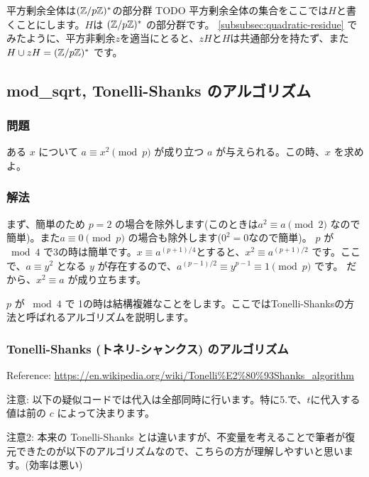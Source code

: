 \documentclass{jsarticle}
\begin{document}
   平方剰余全体は$(\mathbb{Z}/p\mathbb{Z})^*$の部分群 TODO
   平方剰余全体の集合をここでは$H$と書くことにします。$H$は $(\mathbb{Z}/p\mathbb{Z})^*$ の部分群です。
   \ref{subsubsec:quadratic-residue} でみたように、平方非剰余$z$を適当にとると、$zH$と$H$は共通部分を持たず、また$H \cup zH = (\mathbb{Z}/p\mathbb{Z})^*$ です。
\subsection{mod\_sqrt, Tonelli-Shanks のアルゴリズム}
\subsubsection{問題}
ある $x$ について $a \equiv x^2 \pmod p$ が成り立つ $a$ が与えられる。この時、$x$ を求めよ。

\subsubsection{解法}
まず、簡単のため $p = 2$ の場合を除外します(このときは$a^2 \equiv a \pmod 2$ なので簡単)。また$a \equiv 0 \pmod p$ の場合も除外します($0^2 = 0$なので簡単)。
$p$ が${}\bmod 4$ で3の時は簡単です。$x \equiv a^{(p+1)/4}$とすると、$x^2 \equiv a^{(p+1)/2}$ です。ここで、$a \equiv y^2$ となる $y$ が存在するので、$a^{(p-1)/2}\equiv y^{p-1}\equiv 1 \pmod p$ です。
だから、$x^2 \equiv a$ が成り立ちます。

$p$ が ${}\bmod 4$ で 1の時は結構複雑なことをします。ここではTonelli-Shanksの方法と呼ばれるアルゴリズムを説明します。

\subsubsection{Tonelli-Shanks (トネリ-シャンクス) のアルゴリズム}
Reference: \url{https://en.wikipedia.org/wiki/Tonelli%E2%80%93Shanks_algorithm}

注意: 以下の疑似コードでは代入は全部同時に行います。特に5.で、$t$に代入する値は前の $c$ によって決まります。

注意2: 本来の Tonelli-Shanks とは違いますが、不変量を考えることで筆者が復元できたのが以下のアルゴリズムなので、こちらの方が理解しやすいと思います。(効率は悪い)
\end{document}
